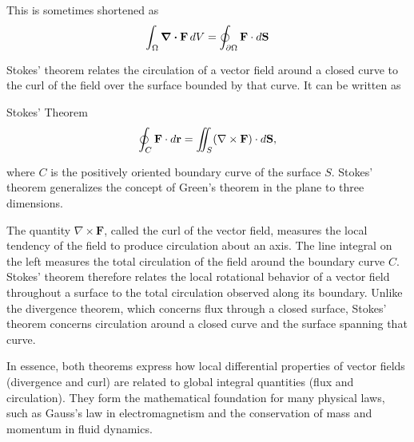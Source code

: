 			This is sometimes shortened as 
			\begin{equation}
				\int_\Omega \div \vb{F} \dd{V} = \oint_{\partial\Omega} \vb{F}\cdot \dd{\vb{S}}
			\end{equation}

			\newpage
			Stokes' theorem relates the circulation of a vector field around a closed curve to the curl of the field over the surface bounded by that curve. It can be written as
			\begin{theorem}{Stokes' Theorem}
				\begin{equation}
					\oint_C \vb{F} \cdot d\mathbf{r} = \iint_S (\nabla \times \mathbf{F}) \cdot d\mathbf{S},
				\end{equation}
			\end{theorem}
			where $C$ is the positively oriented boundary curve of the surface $S$. Stokes' theorem generalizes the concept of Green's theorem in the plane to three dimensions.

			The quantity $\nabla\times\mathbf{F}$, called the curl of the vector field, measures the local tendency of the field to produce circulation about an axis. The line integral on the left measures the total circulation of the field around the boundary curve $C$. Stokes' theorem therefore relates the local rotational behavior of a vector field throughout a surface to the total circulation observed along its boundary. Unlike the divergence theorem, which concerns flux through a closed surface, Stokes' theorem concerns circulation around a closed curve and the surface spanning that curve.

			\begin{remark}
				In essence, both theorems express how local differential properties of vector fields (divergence and curl) are related to global integral quantities (flux and circulation). They form the mathematical foundation for many physical laws, such as Gauss's law in electromagnetism and the conservation of mass and momentum in fluid dynamics.
			\end{remark}

			\newpage

